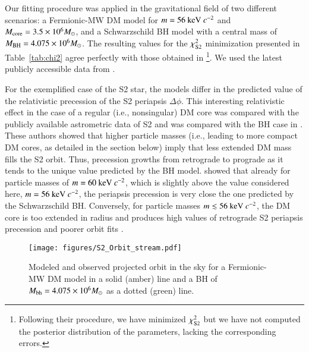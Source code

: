 \documentclass[referee]{aa} %
\begin{document}
Our fitting procedure was applied in the gravitational field of two different scenarios: a Fermionic-MW DM model for $m=56~{\rm keV}~c^{-2}$ and $M_{\rm{core}}=3.5\times 10^6 M_\odot$, and a Schwarzschild BH model with a central mass of $M_{\rm BH}=4.075\times 10^6 M_\odot$.
The resulting values for the $\chi^2_{\rm{S2}}$ minimization presented in Table~\ref{tab:chi2} agree perfectly with those obtained in \cite{2020A&A...641A..34B}\footnote{Following their procedure, we have minimized $\chi^2_{\rm{S2}}$ but we have not computed the posterior distribution of the parameters, lacking the corresponding errors.}.
We used the latest publicly accessible data from \cite{2019Sci...365..664D}.

For the exemplified case of the S2 star, the models differ in the predicted value of the relativistic precession of the S2 periapsis $\Delta \phi$. This interesting relativistic effect in the case of a regular (i.e., nonsingular) DM core was compared with the publicly available astrometric data of S2 and was compared with the BH case in \cite{2022MNRAS.511L..35A}. These authors showed that higher particle masses (i.e., leading to more compact DM cores, as detailed in the section below) imply that less extended DM mass fills the S2 orbit. Thus, precession growths from retrograde to prograde as it tends to the unique value predicted by the BH model. \cite{2022MNRAS.511L..35A} showed that already for particle masses of $m = 60~{\rm keV}~c^{-2}$, which is slightly above the value considered here, $m=56~{\rm keV}~c^{-2}$, the periapsis precession is very close the one predicted by the Schwarzschild BH. Conversely, for particle masses $m\lesssim 56~{\rm keV}~c^{-2}$, the DM core is too extended in radius and produces high values of retrograde S2 periapsis precession and poorer orbit fits \citep{2020A&A...641A..34B,2022MNRAS.511L..35A}. %
%
%
\begin{figure}
   \texttt{[image: figures/S2\_Orbit\_stream.pdf]}
\caption{Modeled and observed projected orbit in the sky for a Fermionic-MW DM model in a solid (amber) line and a BH of $M_{\rm bh}=4.075\times 10^6 M_\odot$ as a dotted (green) line.}
   \label{fig:S2_fit}
\end{figure}
\end{document}
